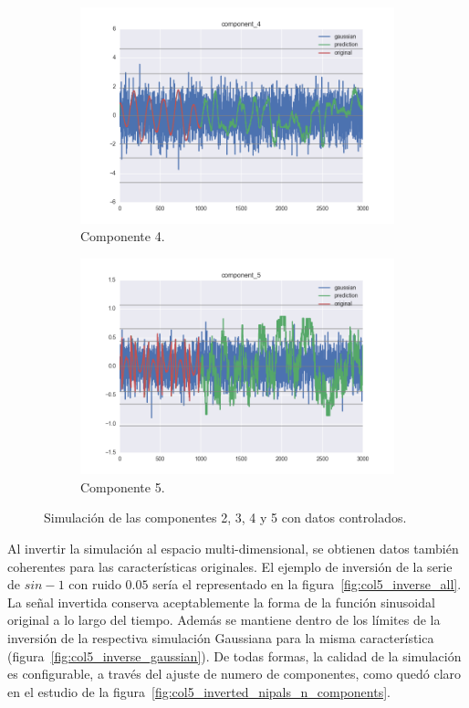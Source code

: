 \documentclass[11pt,spanish,listoffigures,listoftables]{tfgetsinf}
\begin{document}
\begin{figure}[H]
\begin{subfigure}[h]{0.49\textwidth}
            \includegraphics[width=\textwidth]{simulated_data_8_columns/component_4.png}
            \caption{Componente 4.}
            \label{fig:component_4}
        \end{subfigure}
        \begin{subfigure}[h]{0.49\textwidth}
            \centering
            \includegraphics[width=\textwidth]{simulated_data_8_columns/component_5.png}
            \caption{Componente 5.}
            \label{fig:component_5}
        \end{subfigure}
        \caption{Simulación de las componentes 2, 3, 4 y 5 con datos controlados.}
        \label{fig:component_x}
    \end{figure}
    
    Al invertir la simulación al espacio multi-dimensional, se obtienen datos también coherentes para las características originales. El ejemplo de inversión de la serie de \(sin - 1\) con ruido \(0.05\) sería el representado en la figura~\ref{fig:col5_inverse_all}. La señal invertida conserva aceptablemente la forma de la función sinusoidal original a lo largo del tiempo. Además se mantiene dentro de los límites de la inversión de la respectiva simulación Gaussiana para la misma característica (figura~\ref{fig:col5_inverse_gaussian}). De todas formas, la calidad de la simulación es configurable, a través del ajuste de numero de componentes, como quedó claro en el estudio de la figura~\ref{fig:col5_inverted_nipals_n_components}.
\end{document}
